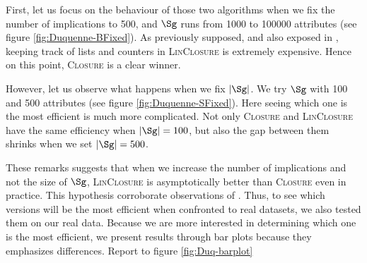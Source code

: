 \vspace{1.2em}

First, let us focus on the behaviour of those two algorithms when we fix the number of implications to 500, and $\Sg$ runs from 1000 to 100000 attributes (see figure \ref{fig:Duquenne-BFixed}). As previously supposed, and also exposed in \cite{bazhanov_optimizations_2014}, keeping track of lists and counters in \textsc{LinClosure} is extremely expensive. Hence on this point, \textsc{Closure} is a clear winner. 

\begin{figure}[H]
	
\end{figure}

However, let us observe what happens when we fix $|\Sg|$. We try $\Sg$ with 100 and 500 attributes (see figure \ref{fig:Duquenne-SFixed}). Here seeing which one
is the most efficient is much more complicated. Not only \textsc{Closure} and \textsc{LinClosure} have the same efficiency when $|\Sg| = 100$, but also the
gap between them shrinks when we set $|\Sg| = 500$.

\begin{figure}[H]
	
\end{figure}

These remarks suggests that when we increase the number of implications and not
the size of $\Sg$, \textsc{LinClosure} is asymptotically better than \textsc{Closure} even in practice. This hypothesis corroborate observations of 
\cite{bazhanov_optimizations_2014}. Thus, to see which versions will be the most
efficient when confronted to real datasets, we also tested them on our real data. Because we are more interested in determining which one is the most efficient, we present results through bar plots because they emphasizes differences. Report to figure \ref{fig:Duq-barplot}

\begin{figure}[H]
	
\end{figure}

\vspace{1.2em}

